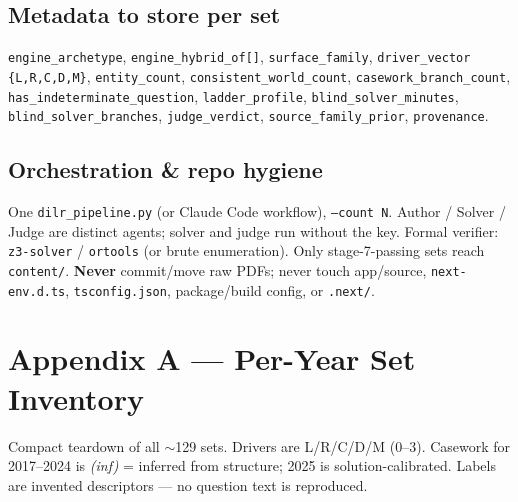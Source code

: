\documentclass[11pt,a4paper]{article}
\begin{document}
\subsection{Metadata to store per set}
\texttt{engine\_archetype}, \texttt{engine\_hybrid\_of[]}, \texttt{surface\_family}, \texttt{driver\_vector \{L,R,C,D,M\}}, \texttt{entity\_count}, \texttt{consistent\_world\_count}, \texttt{casework\_branch\_count}, \texttt{has\_indeterminate\_question}, \texttt{ladder\_profile}, \texttt{blind\_solver\_minutes}, \texttt{blind\_solver\_branches}, \texttt{judge\_verdict}, \texttt{source\_family\_prior}, \texttt{provenance}.

\subsection{Orchestration \& repo hygiene}
One \texttt{dilr\_pipeline.py} (or Claude Code workflow), \texttt{--count N}. Author / Solver / Judge are distinct agents; solver and judge run without the key. Formal verifier: \texttt{z3-solver} / \texttt{ortools} (or brute enumeration). Only stage-7-passing sets reach \texttt{content/}. \textbf{Never} commit/move raw PDFs; never touch app/source, \texttt{next-env.d.ts}, \texttt{tsconfig.json}, package/build config, or \texttt{.next/}.

\section{Appendix A --- Per-Year Set Inventory}

Compact teardown of all $\sim$129 sets. Drivers are L/R/C/D/M (0--3). Casework for 2017--2024 is \emph{(inf)} = inferred from structure; 2025 is solution-calibrated. Labels are invented descriptors --- no question text is reproduced.
\end{document}
